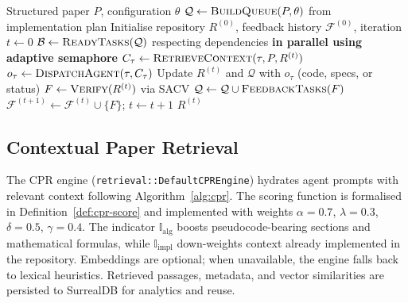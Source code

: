 \documentclass{ieeeaccess}
\begin{document}
\begin{algorithm}[!t]
\caption{Adaptive multi-agent orchestration loop}
\label{alg:adaptive-loop}
\begin{algorithmic}[1]
\Require Structured paper \(P\), configuration \(\theta\)
\State \(\mathcal{Q} \gets \textsc{BuildQueue}(P, \theta)\) from implementation plan
\State Initialise repository \(R^{(0)}\), feedback history \(\mathcal{F}^{(0)}\), iteration \(t \gets 0\)
    \State \(\mathcal{B} \gets \textsc{ReadyTasks}(\mathcal{Q})\) respecting dependencies
     \textbf{in parallel using adaptive semaphore}
        \State \(C_\tau \gets \textsc{RetrieveContext}(\tau, P, R^{(t)})\)
        \State \(o_\tau \gets \textsc{DispatchAgent}(\tau, C_\tau)\)
        \State Update \(R^{(t)}\) and \(\mathcal{Q}\) with \(o_\tau\) (code, specs, or status)
    \EndFor
    \State \(F \gets \textsc{Verify}(R^{(t)})\) via SACV
    \State \(\mathcal{Q} \gets \mathcal{Q} \cup \textsc{FeedbackTasks}(F)\)
    \State \(\mathcal{F}^{(t+1)} \gets \mathcal{F}^{(t)} \cup \{F\}\); \(t \gets t+1\)
\EndWhile
\State \Return \(R^{(t)}\)
\end{algorithmic}
\end{algorithm}

\subsection{Contextual Paper Retrieval}
The CPR engine (\texttt{retrieval::DefaultCPREngine}) hydrates agent prompts with relevant context following Algorithm~\ref{alg:cpr}. The scoring function is formalised in Definition~\ref{def:cpr-score} and implemented with weights \(\alpha=0.7\), \(\lambda=0.3\), \(\delta=0.5\), \(\gamma=0.4\). The indicator \(\mathbb{I}_{\text{alg}}\) boosts pseudocode-bearing sections and mathematical formulas, while \(\mathbb{I}_{\text{impl}}\) down-weights context already implemented in the repository. Embeddings are optional; when unavailable, the engine falls back to lexical heuristics. Retrieved passages, metadata, and vector similarities are persisted to SurrealDB for analytics and reuse.
\end{document}
